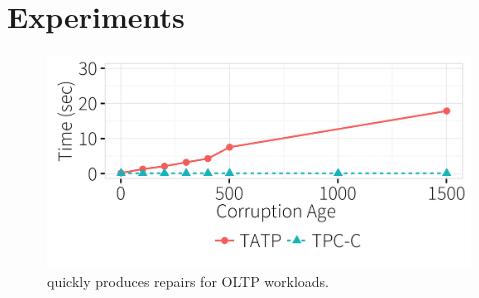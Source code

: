 


\section{Experiments}
\label{sec:experiments}

\begin{figure}[!htb]
\centering
  \includegraphics[width = .75\columnwidth]{figures/benchmark_time}
  \vspace*{-.2in}
  \caption{\sys quickly produces repairs for OLTP workloads.}
  \label{f:tpcctatp} 
\end{figure}

